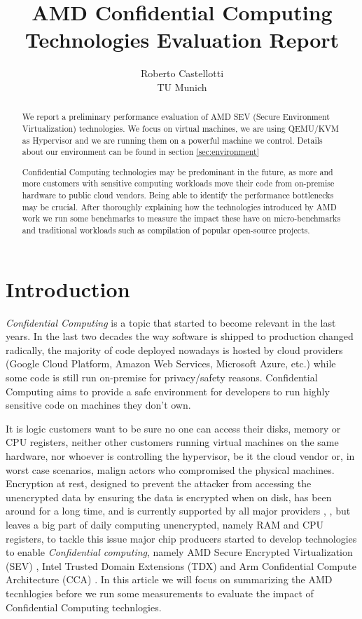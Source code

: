 \documentclass[twocolumn]{article}
\begin{document}
\date{}
\title{\Large \bf AMD Confidential Computing Technologies Evaluation Report}
\author{{\rm Roberto Castellotti}\\TU Munich}
\maketitle


\begin{abstract}
We report a preliminary performance evaluation of AMD SEV (Secure Environment Virtualization) technologies.
We focus on virtual machines, we are using QEMU/KVM as Hypervisor and we are running them on a powerful machine we control.
Details about our environment can be found in section \ref{sec:environment}

Confidential Computing technologies may be predominant in the future, as more and more customers with sensitive computing workloads move their code from on-premise hardware to public cloud vendors. Being able to identify the performance bottlenecks may be crucial. After thoroughly explaining how the technologies introduced by AMD work we run some benchmarks to measure the impact these have on micro-benchmarks and traditional workloads such as compilation of popular open-source projects.
\end{abstract}

\section{Introduction}

\textit{Confidential Computing} is a topic that started to become relevant in the last years. In the last two decades the way software is shipped to production changed radically, the majority of code deployed nowadays is hosted by cloud providers (Google Cloud Platform, Amazon Web Services, Microsoft Azure, etc.) while some code is still run on-premise for privacy/safety reasons. Confidential Computing aims to provide a safe environment for developers to run highly sensitive code on machines they don't own. 

It is logic customers want to be sure no one can access their disks, memory or CPU registers, neither other customers running virtual machines on the same hardware, nor whoever is controlling the hypervisor, be it  the cloud vendor  or, in worst case scenarios, malign actors who compromised the physical machines. Encryption at rest, designed to prevent the attacker from accessing the unencrypted data by ensuring the data is encrypted when on disk, has been around for a long time, and is currently supported by all major providers \cite{aws-enc}, \cite{gcp-enc}, \cite{azure-enc} but leaves a big part of daily computing unencrypted, namely RAM and CPU registers, to tackle this issue major chip producers started to develop technologies to enable \textit{Confidential computing}, namely AMD Secure Encrypted Virtualization (SEV) \cite{memory-encryption}, Intel Trusted Domain Extensions (TDX) \cite{tdx} and Arm Confidential Compute Architecture (CCA) \cite{cca}. In this article we will focus on summarizing the AMD tecnhlogies before we run some measurements to evaluate the impact of Confidential Computing technlogies.
\end{document}
